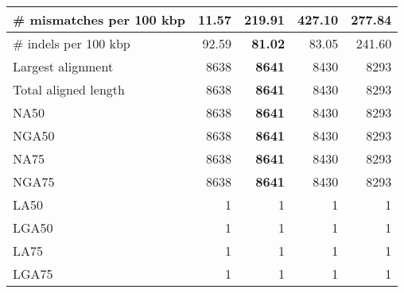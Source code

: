 \documentclass[12pt,a4paper]{article}
\begin{document}
\begin{table}[ht]
\begin{center}
\begin{tabular}{|l*{4}{|r}|}
\# mismatches per 100 kbp & {\bf 11.57} & 219.91 & 427.10 & 277.84 \\ \hline
\# indels per 100 kbp & 92.59 & {\bf 81.02} & 83.05 & 241.60 \\ \hline
Largest alignment & 8638 & {\bf 8641} & 8430 & 8293 \\ \hline
Total aligned length & 8638 & {\bf 8641} & 8430 & 8293 \\ \hline
NA50 & 8638 & {\bf 8641} & 8430 & 8293 \\ \hline
NGA50 & 8638 & {\bf 8641} & 8430 & 8293 \\ \hline
NA75 & 8638 & {\bf 8641} & 8430 & 8293 \\ \hline
NGA75 & 8638 & {\bf 8641} & 8430 & 8293 \\ \hline
LA50 & 1 & 1 & 1 & 1 \\ \hline
LGA50 & 1 & 1 & 1 & 1 \\ \hline
LA75 & 1 & 1 & 1 & 1 \\ \hline
LGA75 & 1 & 1 & 1 & 1 \\ \hline
\end{tabular}
\end{center}
\end{table}
\end{document}
